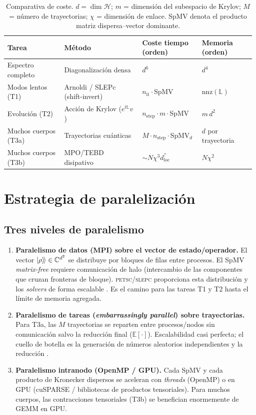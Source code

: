 \documentclass[11pt,a4paper]{article}
\theoremstyle{definition}
\theoremstyle{plain}
\newcommand{\Hs}{\mathcal{H}}
\begin{document}
\begin{table}[h]
\centering
\small
\begin{tabular}{@{}llll@{}}
\toprule
Tarea & Método & Coste tiempo (orden) & Memoria (orden) \\
\midrule
Espectro completo & Diagonalización densa & $d^6$ & $d^4$ \\
Modos lentos (T1) & Arnoldi / SLEPc (shift-invert) & $n_{\mathrm{it}}\cdot$SpMV & $\mathrm{nnz}(\mathbb{L})$ \\
Evolución (T2) & Acción de Krylov ($e^{t\mathbb{L}}v$) & $n_{\mathrm{step}}\cdot m\cdot$SpMV & $m\,d^2$ \\
Muchos cuerpos (T3a) & Trayectorias cuánticas & $M\cdot n_{\mathrm{step}}\cdot$SpMV$_d$ & $d$ por trayectoria \\
Muchos cuerpos (T3b) & MPO/TEBD disipativo & $\sim N\chi^3 d_{\mathrm{loc}}^{?}$ & $N\chi^2$ \\
\bottomrule
\end{tabular}
\caption{Comparativa de coste. $d=\dim\Hs$; $m$ = dimensión del subespacio de Krylov; $M$ = número de
trayectorias; $\chi$ = dimensión de enlace. SpMV denota el producto matriz dispersa--vector dominante.}
\end{table}

\section{Estrategia de paralelización}

\subsection{Tres niveles de paralelismo}

\begin{enumerate}[leftmargin=1.6em,itemsep=3pt]
\item \textbf{Paralelismo de datos (MPI) sobre el vector de estado/operador.} El vector
$\ket{\rho}\!\rangle\in\mathbb{C}^{d^2}$ se distribuye por bloques de filas entre procesos. El SpMV
\emph{matrix-free} requiere comunicación de halo (intercambio de las componentes que cruzan fronteras de
bloque). \textsc{petsc/slepc} proporciona esta distribución y los \emph{solvers} de forma escalable
\cite{Balay2023,Hernandez2005}. Es el camino para las tareas T1 y T2 hasta el límite de memoria agregada.
\item \textbf{Paralelismo de tareas (\emph{embarrassingly parallel}) sobre trayectorias.} Para T3a, las $M$
trayectorias se reparten entre procesos/nodos sin comunicación salvo la reducción final
($\mathbb{E}[\cdot]$). Escalabilidad casi perfecta; el cuello de botella es la generación de números
aleatorios independientes y la reducción \cite{Daley2014}.
\item \textbf{Paralelismo intranodo (OpenMP / GPU).} Cada SpMV y cada producto de Kronecker dispersos se
aceleran con \emph{threads} (OpenMP) o en GPU (cuSPARSE / bibliotecas de productos tensoriales). Para
muchos cuerpos, las contracciones tensoriales (T3b) se benefician enormemente de GEMM en GPU.
\end{enumerate}
\end{document}

